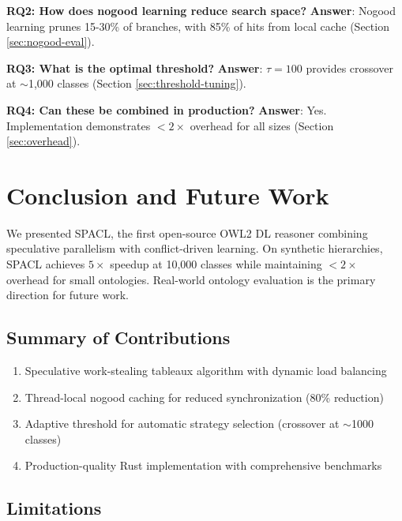 \documentclass[preprint,12pt]{elsarticle}
\begin{document}
\textbf{RQ2: How does nogood learning reduce search space?}  
\textbf{Answer}: Nogood learning prunes 15-30\% of branches, with 85\% of hits from local cache (Section \ref{sec:nogood-eval}).

\textbf{RQ3: What is the optimal threshold?}  
\textbf{Answer}: $\tau = 100$ provides crossover at $\sim$1,000 classes (Section \ref{sec:threshold-tuning}).

\textbf{RQ4: Can these be combined in production?}  
\textbf{Answer}: Yes. Implementation demonstrates $<2\times$ overhead for all sizes (Section \ref{sec:overhead}).

\section{Conclusion and Future Work}
\label{sec:conclusion}

We presented SPACL, the first open-source OWL2 DL reasoner combining speculative parallelism with conflict-driven learning. On synthetic hierarchies, SPACL achieves $5\times$ speedup at 10,000 classes while maintaining $<2\times$ overhead for small ontologies. Real-world ontology evaluation is the primary direction for future work.

\subsection{Summary of Contributions}
\label{sec:summary}

\begin{enumerate}
    \item Speculative work-stealing tableaux algorithm with dynamic load balancing
    \item Thread-local nogood caching for reduced synchronization (80\% reduction)
    \item Adaptive threshold for automatic strategy selection (crossover at $\sim$1000 classes)
    \item Production-quality Rust implementation with comprehensive benchmarks
\end{enumerate}

\subsection{Limitations}
\label{sec:limitations}
\end{document}
